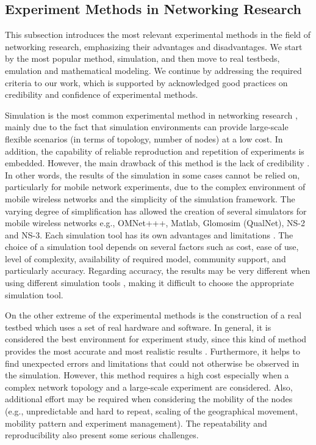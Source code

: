 \subsection{Experiment Methods in Networking Research}
This subsection introduces the most relevant experimental methods in the field of networking research, emphasizing their advantages and disadvantages. We start by the most popular method, simulation, and then move to real testbeds, emulation and mathematical modeling. We continue by addressing the required criteria to our work, which is supported by acknowledged good practices on credibility and confidence of experimental methods.  

Simulation is the most common experimental method in networking research \cite{MANET_simulation} \cite{case_study_simulation}, mainly due to the fact that simulation environments can provide large-scale flexible scenarios (in terms of topology, number of nodes) at a low cost. In addition, the capability of reliable reproduction and repetition of experiments is embedded. However, the main drawback of this method is the lack of credibility \cite{credibility_simulation,improving_confidence}. In other words, the results of the simulation in some cases cannot be relied on, particularly for mobile network experiments, due to the complex environment of mobile wireless networks and the simplicity of the simulation framework. The varying degree of simplification has allowed the creation of several simulators for mobile wireless networks e.g., OMNet+++, Matlab, Glomosim (QualNet), NS-2 and NS-3. Each simulation tool has its own advantages and limitations \cite{case_study_simulation}. The choice of a simulation tool depends on several factors such as cost, ease of use, level of complexity, availability of required model, community support, and particularly accuracy. Regarding accuracy, the results may be very different when using different simulation tools \cite{accuracy_MANET}, making it difficult to choose the appropriate simulation tool.

On the other extreme of the experimental methods is the construction of a real testbed which uses a set of real hardware and software. In general, it is considered the best environment for experiment study, since this kind of method provides the most accurate and most realistic results \cite{real_testbed_Montavont}. Furthermore, it helps to find unexpected errors and limitations that could not otherwise be observed in the simulation. However, this method requires a high cost especially when a complex network topology and a large-scale experiment are considered. Also, additional effort may be required when considering the mobility of the nodes (e.g., unpredictable and hard to repeat, scaling of the geographical movement, mobility pattern and experiment management). The repeatability and reproducibility also present some serious challenges.  

